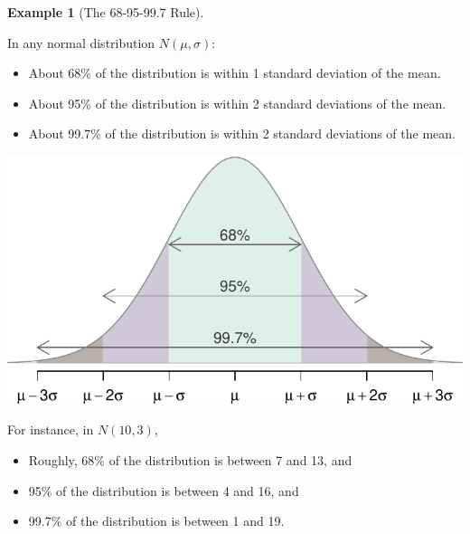 \documentclass[
]{book}
\providecommand{\tightlist}{%
  \setlength{\itemsep}{0pt}\setlength{\parskip}{0pt}}
\theoremstyle{definition}
\theoremstyle{definition}
\newtheorem{example}{Example}[chapter]
\theoremstyle{definition}
\theoremstyle{definition}
\theoremstyle{remark}
\begin{document}
\begin{example}[The 68-95-99.7 Rule]
\protect\hypertarget{exm:normal-rule-of-thumb}{}\label{exm:normal-rule-of-thumb}

In any normal distribution \(N(\mu, \sigma)\):

\begin{itemize}
\tightlist
\item
  About 68\% of the distribution is within 1 standard deviation of the mean.
\item
  About 95\% of the distribution is within 2 standard deviations of the mean.
\item
  About 99.7\% of the distribution is within 2 standard deviations of the mean.
\end{itemize}

\includegraphics{math340-notes_files/figure-latex/unnamed-chunk-18-1.pdf}

For instance, in \(N(10,3)\),

\begin{itemize}
\tightlist
\item
  Roughly, 68\% of the distribution is between 7 and 13, and
\item
  95\% of the distribution is between 4 and 16, and
\item
  99.7\% of the distribution is between 1 and 19.
\end{itemize}

\end{example}
\end{document}
